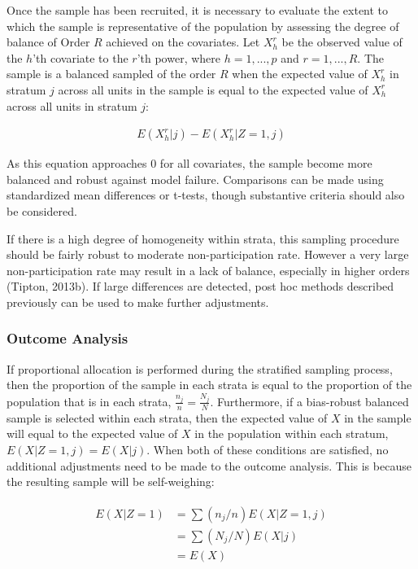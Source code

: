 \documentclass[man,floatsintext]{apa6}
\begin{document}
Once the sample has been recruited, it is necessary to evaluate the extent to which the sample is representative of the population by assessing the degree of balance of Order \(R\) achieved on the covariates. Let \(X^r_h\) be the observed value of the \(h\)'th covariate to the \(r\)'th power, where \(h = {1, ..., p}\) and \(r = {1, ..., R}\). The sample is a balanced sampled of the order \(R\) when the expected value of \(X^r_h\) in stratum \(j\) across all units in the sample is equal to the expected value of \(X^r_h\) across all units in stratum \(j\):

\begin{align}
  E(X^r_h|j) - E(X^r_h|Z = 1, j)
\end{align}

As this equation approaches 0 for all covariates, the sample become more balanced and robust against model failure. Comparisons can be made using standardized mean differences or t-tests, though substantive criteria should also be considered.

If there is a high degree of homogeneity within strata, this sampling procedure should be fairly robust to moderate non-participation rate. However a very large non-participation rate may result in a lack of balance, especially in higher orders (Tipton, 2013b). If large differences are detected, post hoc methods described previously can be used to make further adjustments.

\hypertarget{outcome-analysis}{%
\subsubsection{Outcome Analysis}\label{outcome-analysis}}

If proportional allocation is performed during the stratified sampling process, then the proportion of the sample in each strata is equal to the proportion of the population that is in each strata, \(\frac{n_j}{n} = \frac{N_j}{N}\). Furthermore, if a bias-robust balanced sample is selected within each strata, then the expected value of \(X\) in the sample will equal to the expected value of \(X\) in the population within each stratum, \(E(X|Z=1,j) = E(X|j)\). When both of these conditions are satisfied, no additional adjustments need to be made to the outcome analysis. This is because the resulting sample will be self-weighing:

\begin{align}
  \begin{split}
    E(X | Z = 1) &= \sum{(n_j/n)E(X | Z = 1, j)} \\
      &= \sum{(N_j/N)E(X | j)} \\
      &= E(X)
  \end{split}
\end{align}
\end{document}

